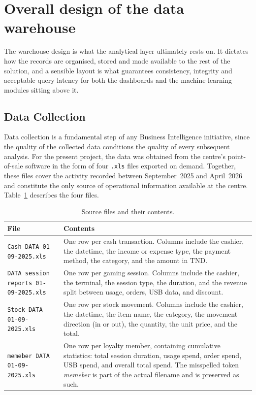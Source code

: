 \documentclass[12pt, a4paper]{report}
\begin{document}
\section{Overall design of the data warehouse}

The warehouse design is what the analytical layer ultimately rests
on. It dictates how the records are organised, stored and made
available to the rest of the solution, and a sensible layout is what
guarantees consistency, integrity and acceptable query latency for
both the dashboards and the machine-learning modules sitting above
it.

\subsection{Data Collection}

Data collection is a fundamental step of any Business Intelligence
initiative, since the quality of the collected data conditions the quality
of every subsequent analysis. For the present project, the data was
obtained from the centre's point-of-sale software in the form of four
\texttt{.xls} files exported on demand. Together, these files cover the
activity recorded between September~2025 and April~2026 and constitute the
only source of operational information available at the centre.
Table~\ref{tab:sourcefiles} describes the four files.

\begin{table}[H]
  \centering
  \caption{Source files and their contents.\label{tab:sourcefiles}}
  \begin{tabular}{p{4.2cm} p{8.3cm}}
    \toprule
    \textbf{File} & \textbf{Contents} \\
    \midrule
    \texttt{Cash DATA 01-09-2025.xls}
      & One row per cash transaction. Columns include the cashier, the
        datetime, the income or expense type, the payment method, the
        category, and the amount in TND. \\[4pt]
    \texttt{DATA session reports 01-09-2025.xls}
      & One row per gaming session. Columns include the cashier, the
        terminal, the session type, the duration, and the revenue split
        between usage, orders, USB data, and discount. \\[4pt]
    \texttt{Stock DATA 01-09-2025.xls}
      & One row per stock movement. Columns include the cashier, the
        datetime, the item name, the category, the movement direction
        (in or out), the quantity, the unit price, and the total. \\[4pt]
    \texttt{memeber DATA 01-09-2025.xls}
      & One row per loyalty member, containing cumulative statistics:
        total session duration, usage spend, order spend, USB spend, and
        overall total spend. The misspelled token \textit{memeber} is
        part of the actual filename and is preserved as such. \\
    \bottomrule
  \end{tabular}
\end{table}
\end{document}
